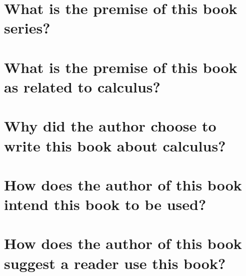 \section{What is the premise of this book series?}

\section{What is the premise of this book as related to calculus?}

\section{Why did the author choose to write this book about calculus?}

\section{How does the author of this book intend this book to be used?}

\section{How does the author of this book suggest a reader use this book?}
